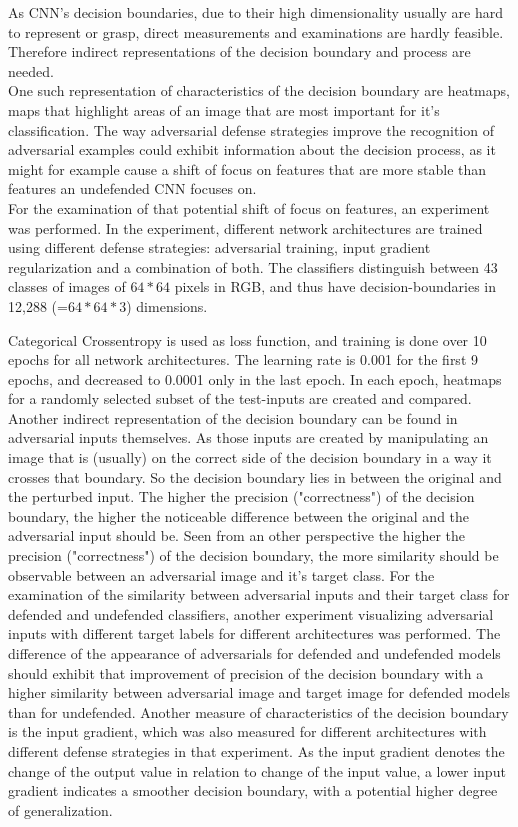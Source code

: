 \documentclass[draft,final]{vutinfth} %
\begin{document}
As CNN's decision boundaries, due to their high dimensionality usually are hard to represent or grasp, direct measurements and examinations are hardly feasible.
Therefore indirect representations of the decision boundary and process are needed.\\
One such representation of characteristics of the decision boundary are heatmaps, maps that highlight areas of an image that are most important for it's classification.
The way adversarial defense strategies improve the recognition of adversarial examples could exhibit information about the decision process, as it might for example cause a shift of focus on features that are more stable than features an undefended CNN focuses on.\\
For the examination of that potential shift of focus on features, an experiment was performed.
In the experiment, different network architectures are trained using different defense strategies: adversarial training, input gradient regularization and a combination of both.
The classifiers distinguish between 43 classes of images of $64*64$ pixels in RGB, and thus have decision-boundaries in 12,288 (=$64*64*3$) dimensions.

Categorical Crossentropy is used as loss function, and training is done over 10 epochs for all network architectures.
The learning rate is 0.001 for the first 9 epochs, and decreased to 0.0001 only in the last epoch.
In each epoch, heatmaps for a randomly selected subset of the test-inputs are created and compared.\\

Another indirect representation of the decision boundary can be found in adversarial inputs themselves.
As those inputs are created by manipulating an image that is (usually) on the correct side of the decision boundary in a way it crosses that boundary.
So the decision boundary lies in between the original and the perturbed input.
The higher the precision ("correctness") of the decision boundary, the higher the noticeable difference between the original and the adversarial input should be.
Seen from an other perspective the higher the precision ("correctness") of the decision boundary, the more similarity should be observable between an adversarial image and it's target class.
For the examination of the similarity between adversarial inputs and their target class for defended and undefended classifiers, another experiment visualizing adversarial inputs with different target labels for different architectures was performed.
The difference of the appearance of adversarials for defended and undefended models should exhibit that improvement of precision of the decision boundary with a higher similarity between adversarial image and target image for defended models than for undefended.
Another measure of characteristics of the decision boundary is the input gradient, which was also measured for different architectures with different defense strategies in that experiment.
As the input gradient denotes the change of the output value in relation to change of the input value, a lower input gradient indicates a smoother decision boundary, with a potential higher degree of generalization.
\end{document}
